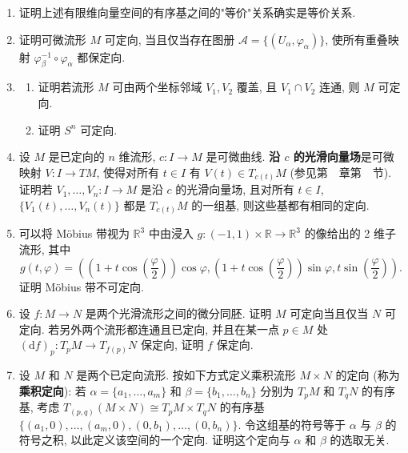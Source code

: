 \begin{RiemannExercise}\label{ex:orientability}
\begin{enumerate}[label=(\arabic*),ref=\arabic*,leftmargin=*]
\item\label{ex:equivalence-of-ordered-bases} 证明上述有限维向量空间的有序基之间的"等价"关系确实是等价关系.
\item\label{ex:characterize-orientable-manifold-by-atlas} 证明可微流形 $M$ 可定向, 当且仅当存在图册 $\mathcal{A}=\{(U_\alpha,\varphi_\alpha)\}$, 使所有重叠映射 $\varphi_\beta^{-1}\circ\varphi_\alpha$ 都保定向.
\item\label{ex:orientability-of-sphere-and-two-chart-manifolds}
\begin{enumerate}[label=(\alph*),leftmargin=*]
\item 证明若流形 $M$ 可由两个坐标邻域 $V_1,V_2$ 覆盖, 且 $V_1\cap V_2$ 连通, 则 $M$ 可定向.
\item 证明 $S^n$ 可定向.
\end{enumerate}
\item\label{ex:orientation-of-bases-along-curve} 设 $M$ 是已定向的 $n$ 维流形, $c:I\to M$ 是可微曲线. \textbf{沿 $c$ 的光滑向量场}是可微映射 $V:I\to TM$, 使得对所有 $t\in I$ 有 $V(t)\in T_{c(t)}M$ (参见第~~章第~~节). 证明若 $V_1,\ldots,V_n:I\to M$ 是沿 $c$ 的光滑向量场, 且对所有 $t\in I$, $\{V_1(t),\ldots,V_n(t)\}$ 都是 $T_{c(t)}M$ 的一组基, 则这些基都有相同的定向.
\item\label{ex:mobius-band-is-not-orientable} 可以将 Möbius 带视为 $\mathbb{R}^3$ 中由浸入 $g:(-1,1)\times\mathbb{R}\to\mathbb{R}^3$ 的像给出的 2 维子流形, 其中
\[
  g(t,\varphi)=\left(
    \left(1+t\cos\left(\frac{\varphi}{2}\right)\right)\cos\varphi,
    \left(1+t\cos\left(\frac{\varphi}{2}\right)\right)\sin\varphi,
    t\sin\left(\frac{\varphi}{2}\right)\right).
\]
证明 Möbius 带不可定向.
\item\label{ex:orientability-preserved-by-diffeomorphism} 设 $f:M\to N$ 是两个光滑流形之间的微分同胚. 证明 $M$ 可定向当且仅当 $N$ 可定向. 若另外两个流形都连通且已定向, 并且在某一点 $p\in M$ 处 $(\mathrm{d}f)_p:T_pM\to T_{f(p)}N$ 保定向, 证明 $f$ 保定向.
\item\label{ex:well-defined-product-orientation} 设 $M$ 和 $N$ 是两个已定向流形. 按如下方式定义乘积流形 $M\times N$ 的定向 (称为\textbf{乘积定向}): 若 $\alpha=\{a_1,\ldots,a_m\}$ 和 $\beta=\{b_1,\ldots,b_n\}$ 分别为 $T_pM$ 和 $T_qN$ 的有序基, 考虑 $T_{(p,q)}(M\times N)\cong T_pM\times T_qN$ 的有序基 $\{(a_1,0),\ldots,(a_m,0),(0,b_1),\ldots,(0,b_n)\}$. 令这组基的符号等于 $\alpha$ 与 $\beta$ 的符号之积, 以此定义该空间的一个定向. 证明这个定向与 $\alpha$ 和 $\beta$ 的选取无关.

\end{enumerate}
\end{RiemannExercise}
